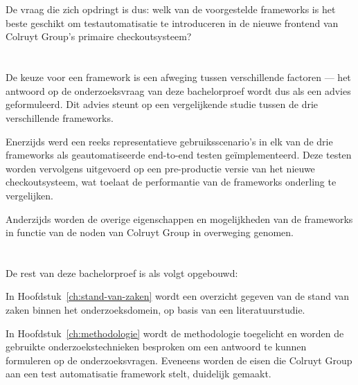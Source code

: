 \section{}
\label{sec:onderzoeksvraag}

De vraag die zich opdringt is dus: welk van de voorgestelde frameworks is het beste geschikt om testautomatisatie te introduceren in de nieuwe frontend van Colruyt Group's primaire checkoutsysteem?

\section{}
\label{sec:onderzoeksdoelstelling}

De keuze voor een framework is een afweging tussen verschillende factoren — het antwoord op de onderzoeksvraag van deze bachelorproef wordt dus als een advies geformuleerd. Dit advies steunt op een vergelijkende studie tussen de drie verschillende frameworks.

Enerzijds werd een reeks representatieve gebruiksscenario's in elk van de drie frameworks als geautomatiseerde end-to-end testen geïmplementeerd. Deze testen worden vervolgens uitgevoerd op een pre-productie versie van het nieuwe checkoutsysteem, wat toelaat de performantie van de frameworks onderling te vergelijken.

Anderzijds worden de overige eigenschappen en mogelijkheden van de frameworks in functie van de noden van Colruyt Group in overweging genomen.

\section{}
\label{sec:opzet-bachelorproef}


De rest van deze bachelorproef is als volgt opgebouwd:

In Hoofdstuk~\ref{ch:stand-van-zaken} wordt een overzicht gegeven van de stand van zaken binnen het onderzoeksdomein, op basis van een literatuurstudie.

In Hoofdstuk~\ref{ch:methodologie} wordt de methodologie toegelicht en worden de gebruikte onderzoekstechnieken besproken om een antwoord te kunnen formuleren op de onderzoeksvragen. Eveneens worden de eisen die Colruyt Group aan een test automatisatie framework stelt, duidelijk gemaakt. 

